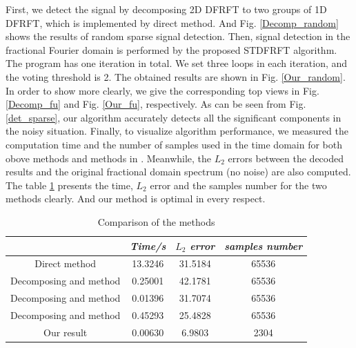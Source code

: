 \documentclass[conference]{IEEEtran}
\begin{document}
First, we detect the signal by decomposing 2D DFRFT to two groups of 1D DFRFT, which is implemented by direct method. And Fig. \ref{Decomp_random} shows the results of random sparse signal detection. Then, signal detection in the fractional Fourier domain is performed by the proposed STDFRFT algorithm. The program has one iteration in total. We set three loops in each iteration, and the voting threshold is 2. The obtained results are shown in Fig. \ref{Our_random}. In order to show more clearly, we give the corresponding top views in Fig. \ref{Decomp_fu} and Fig. \ref{Our_fu}, respectively. As can be seen from Fig. \ref{det_sparse}, our algorithm accurately detects all the significant components in the noisy situation. Finally, to visualize algorithm performance, we measured the computation time and the number of samples used in the time domain for both obove methods and methods in \cite{Ozaktas,b2,JR}. Meanwhile, the ${L_2}$ errors between the decoded results and the original fractional domain spectrum (no noise) are also computed. The table \ref{compare} presents the time, ${L_2}$ error and the samples number for the two methods clearly. And our method is optimal in every respect. 
 

 \begin{table}[t]
	\caption{Comparison of the methods}
	\begin{center}
		\begin{tabular}{cccc}
			\toprule %
			& \textbf{\textit{Time/s}}& \textbf{\textit{${L_2}$ error}}& \textbf{\textit{samples number}} \\
			\midrule %
			{Direct method}& {13.3246} & {31.5184} & {65536} \\
			{Decomposing and \cite{Ozaktas} method}&  {0.25001} & {42.1781} & {65536} \\
			{Decomposing and \cite{b2} method}& {0.01396} & {31.7074} &{65536} \\
			{Decomposing and \cite{JR} method}& { 0.45293} & {25.4828} &{65536} \\
			Our result& 0.00630 & 6.9803 & 2304 \\
			\bottomrule %
		\end{tabular}
		\label{compare}
	\end{center}
\end{table}
\end{document}
